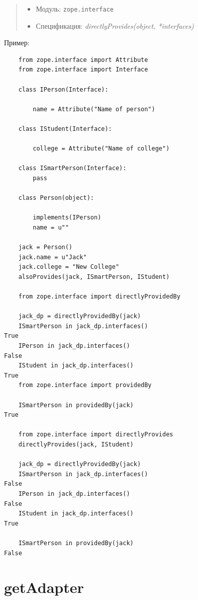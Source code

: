 \documentclass[a4paper,openany,twoside,final]{book}
\providecommand*{\DUroletitlereference}[1]{\textsl{#1}}
\begin{document}
\begin{quote}

\begin{itemize}

\item Модуль: \texttt{zope.interface}

\item Спецификация: \DUroletitlereference{directlyProvides(object, *interfaces)}

\end{itemize}

\end{quote}

Пример:

\begin{verbatim}
    from zope.interface import Attribute
    from zope.interface import Interface

    class IPerson(Interface):

        name = Attribute("Name of person")

    class IStudent(Interface):

        college = Attribute("Name of college")

    class ISmartPerson(Interface):
        pass

    class Person(object):

        implements(IPerson)
        name = u""

    jack = Person()
    jack.name = u"Jack"
    jack.college = "New College"
    alsoProvides(jack, ISmartPerson, IStudent)

    from zope.interface import directlyProvidedBy

    jack_dp = directlyProvidedBy(jack)
    ISmartPerson in jack_dp.interfaces()
True
    IPerson in jack_dp.interfaces()
False
    IStudent in jack_dp.interfaces()
True
    from zope.interface import providedBy

    ISmartPerson in providedBy(jack)
True

    from zope.interface import directlyProvides
    directlyProvides(jack, IStudent)

    jack_dp = directlyProvidedBy(jack)
    ISmartPerson in jack_dp.interfaces()
False
    IPerson in jack_dp.interfaces()
False
    IStudent in jack_dp.interfaces()
True

    ISmartPerson in providedBy(jack)
False
\end{verbatim}


\section*{getAdapter%
  \label{getadapter}%
}
\end{document}
